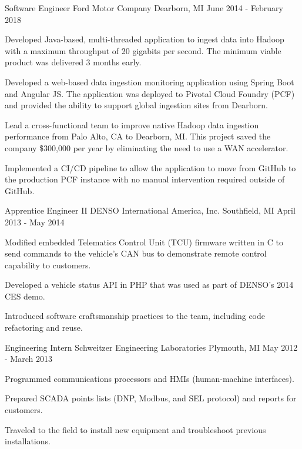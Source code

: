 \documentclass[11pt, a4paper]{awesome-cv}
\begin{document}
\begin{cventries}
    \cventry
    {Software Engineer}
    {Ford Motor Company}
    {Dearborn, MI}
    {June 2014 - February 2018}
    {
        \begin{cvitems}
            \item{Developed Java-based, multi-threaded application to ingest data into Hadoop with a maximum throughput of 20 gigabits per second. The minimum viable product was delivered 
                  3 months early.}
            \item{Developed a web-based data ingestion monitoring application using Spring Boot and Angular JS. The application was deployed to Pivotal Cloud Foundry (PCF) and provided the 
                  ability to support global ingestion sites from Dearborn.}
            \item{Lead a cross-functional team to improve native Hadoop data ingestion performance from Palo Alto, CA to Dearborn, MI. This project saved the company \$300,000 per year by 
                  eliminating the need to use a WAN accelerator.}
            \item{Implemented a CI/CD pipeline to allow the application to move from GitHub to the production PCF instance with no manual 
                  intervention required outside of GitHub.}
        \end{cvitems}
    }
    
    \cventry
    {Apprentice Engineer II}
    {DENSO International America, Inc.}
    {Southfield, MI}
    {April 2013 - May 2014}
    {
        \begin{cvitems}
            \item{Modified embedded Telematics Control Unit (TCU) firmware written in C to send commands to the vehicle's CAN bus to demonstrate remote control capability to customers.}
            \item{Developed a vehicle status API in PHP that was used as part of DENSO's 2014 CES demo.}
            \item{Introduced software craftsmanship practices to the team, including code refactoring and reuse.}
        \end{cvitems}
    }
    
    \cventry
    {Engineering Intern}
    {Schweitzer Engineering Laboratories}
    {Plymouth, MI}
    {May 2012 - March 2013}
    {
        \begin{cvitems}
            \item{Programmed communications processors and HMIs (human-machine interfaces).}
            \item{Prepared SCADA points lists (DNP, Modbus, and SEL protocol) and reports for customers.}
            \item{Traveled to the field to install new equipment and troubleshoot previous installations.}
        \end{cvitems}
    }
\end{cventries}
\end{document}
